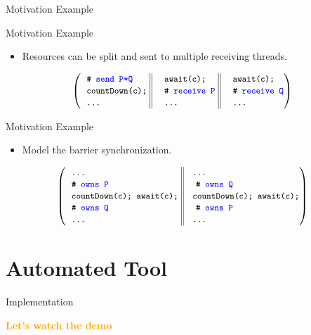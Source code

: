 \documentclass[11pt]{beamer}
\newcommand\orange[1]{\textcolor{orange}{\textbf{#1}}}
\begin{document}
\begin{frame}{Motivation Example}

\end{frame}

\begin{frame}{Motivation Example}
  \begin{itemize}
    \item Resources can be split and sent to multiple receiving threads.
    \end{itemize}
\begin{center}
\[
{
\left(
\begin{tabular}{ l@{\extracolsep{\fill}} || 
                 l@{\extracolsep{\fill}} || 
                 l@{\extracolsep{\fill}} }
\BCOMMENT{\SPEC{send P*Q}} ~&~ \code{await(c);} ~&~ \code{await(c);}\\
\code{countDown(c);} ~&~ \BCOMMENT{\SPEC{receive P}} ~&~ \BCOMMENT{\SPEC{receive Q}}\\
\code{\ldots} ~&~ \code{\ldots} ~&~ \code{\ldots}\\
\end{tabular}\right)
}
\]
\end{center}

\end{frame}
\begin{frame}{Motivation Example}
  \begin{itemize}
    \item Model the barrier synchronization.
    \end{itemize}
\begin{center}
\[
{
\left(
\begin{tabular}{ l@{\extracolsep{\fill}}  || l@{\extracolsep{\fill}} }
\code{\ldots} ~&~\code{\ldots}\\
\BCOMMENT{\SPEC{owns P}} ~&~ \BCOMMENT{\SPEC{owns Q}}\\
\code{countDown(c);~await(c);} ~&~\code{countDown(c);~await(c);}\\
\BCOMMENT{\SPEC{owns Q}} ~&~ \BCOMMENT{\SPEC{owns P}}\\
\code{\ldots} ~&~\code{\ldots}\\
\end{tabular}\right)
}
\]
\end{center}
\end{frame}




\section{Automated Tool}
\begin{frame}{Implementation}
  \begin{center}
    \Large \orange{Let's watch the demo}
  \end{center}
\end{frame}
\end{document}
